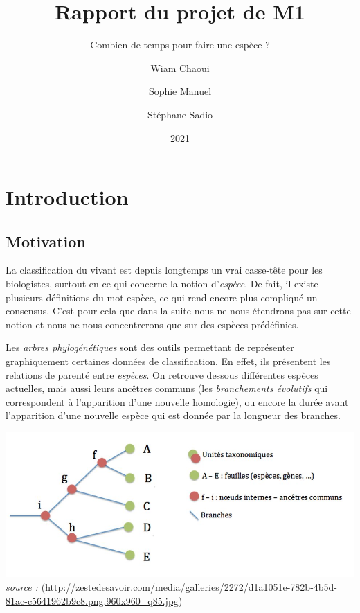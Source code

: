\documentclass[
]{book}
\title{Rapport du projet de M1}
\subtitle{Combien de temps pour faire une espèce ?}
\author{Wiam Chaoui \and Sophie Manuel \and Stéphane Sadio}
\date{2021}
\begin{document}
\maketitle

{
\setcounter{tocdepth}{1}
\tableofcontents
}
\newtheorem{dfn}{Définition}
\newtheorem{exem}{Exemple}
\newtheorem{exemple}{Exemple}
\newtheorem{corol}{Corollaire}
\newtheorem{prop}{Proposition}
\newtheorem{lem}{Lemme}
\newtheorem{demo}{Démonstration}
\newtheorem{rem}{Remarque}
\newtheorem{propri}{Propriété}
\newtheorem{thm}{Théorème}
\newtheorem*{cmtr}{Commentaire}

\hypertarget{intro}{%
\chapter{Introduction}\label{intro}}

\hypertarget{motivation}{%
\section{Motivation}\label{motivation}}

\hspace*{0.5cm}
La classification du vivant est depuis longtemps un vrai casse-tête pour les biologistes, surtout en ce qui concerne la notion d'\emph{espèce}. De fait, il existe plusieurs définitions du mot espèce, ce qui rend encore plus compliqué un consensus. C'est pour cela que dans la suite nous ne nous étendrons pas sur cette notion et nous ne nous concentrerons que sur des espèces prédéfinies.

\hspace*{0.5cm}
Les \emph{arbres phylogénétiques} sont des outils permettant de représenter graphiquement certaines données de classification. En effet, ils présentent les relations de parenté entre \emph{espèces}. On retrouve dessous différentes espèces actuelles, mais aussi leurs ancêtres communs (les \emph{branchements évolutifs} qui correspondent à l'apparition d'une nouvelle homologie), ou encore la durée avant l'apparition d'une nouvelle espèce qui est donnée par la longueur des branches.

\includegraphics{Images/arbre_intro.jpg}\\
\emph{source :} (\url{http://zestedesavoir.com/media/galleries/2272/d1a1051e-782b-4b5d-81ac-c5641962b9c8.png.960x960_q85.jpg})
\end{document}

